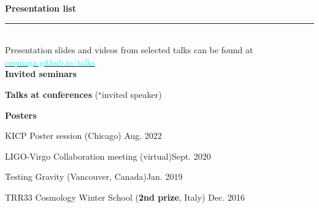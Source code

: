 \documentclass[11pt,a4paper]{article}
\newcommand{\sectionsep}{12pt}
\newcommand{\starr}{\textbf{$^{\mathbf{\star}}$}}
\newcounter{seminars}
\newcounter{talks}
\newcounter{talks_inv}
\begin{document}
\vspace{\sectionsep}
\textbf{Presentation list} \vspace{-8pt}\\ {\rule{\linewidth}{0.6pt}}\vspace{5pt}\\
Presentation slides and videos from selected talks can be found at \href{https://ezquiaga.github.io/talks.html}{\textcolor{cyan}{ezquiaga.github.io/talks}} \vspace{5pt}\\%
\textbf{Invited seminars} \\
\vspace{-20pt}


\textbf{Talks at conferences} (\starr  invited speaker) \\
\vspace{-20pt}


\textbf{Posters} \\
\vspace{-20pt}
\begin{etaremune}[itemsep=0pt,parsep=0pt]
\item KICP Poster session (Chicago) \hfill Aug. 2022
\item LIGO-Virgo Collaboration meeting (virtual)\hfill Sept. 2020
\item Testing Gravity (Vancouver, Canada)\hfill Jan. 2019
\item TRR33 Cosmology Winter School (\textbf{2nd prize}, Italy) \hfill Dec. 2016
\end{etaremune}
\end{document}
